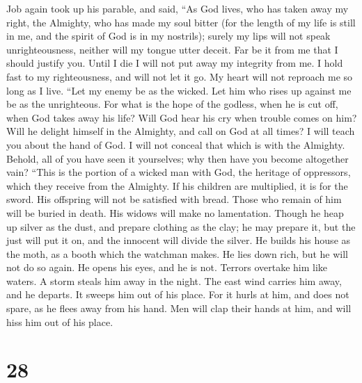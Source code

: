  Job again took up his parable, and said, 
``As God lives, who has taken away my right, the Almighty, who has made
my soul bitter  (for the length of my life is still in me,
and the spirit of God is in my nostrils);  surely my lips
will not speak unrighteousness, neither will my tongue utter deceit.
 Far be it from me that I should justify you. Until I die
I will not put away my integrity from me.  I hold fast to
my righteousness, and will not let it go. My heart will not reproach me
so long as I live.  ``Let my enemy be as the wicked. Let
him who rises up against me be as the unrighteous.  For
what is the hope of the godless, when he is cut off, when God takes away
his life?  Will God hear his cry when trouble comes on
him?  Will he delight himself in the Almighty, and call
on God at all times?  I will teach you about the hand of
God. I will not conceal that which is with the Almighty. 
Behold, all of you have seen it yourselves; why then have you become
altogether vain?  ``This is the portion of a wicked man
with God, the heritage of oppressors, which they receive from the
Almighty.  If his children are multiplied, it is for the
sword. His offspring will not be satisfied with bread. 
Those who remain of him will be buried in death. His widows will make no
lamentation.  Though he heap up silver as the dust, and
prepare clothing as the clay;  he may prepare it, but the
just will put it on, and the innocent will divide the silver.
 He builds his house as the moth, as a booth which the
watchman makes.  He lies down rich, but he will not do so
again. He opens his eyes, and he is not.  Terrors
overtake him like waters. A storm steals him away in the night.
 The east wind carries him away, and he departs. It
sweeps him out of his place.  For it hurls at him, and
does not spare, as he flees away from his hand.  Men will
clap their hands at him, and will hiss him out of his place.

\hypertarget{section-27}{%
\section{28}\label{section-27}}

